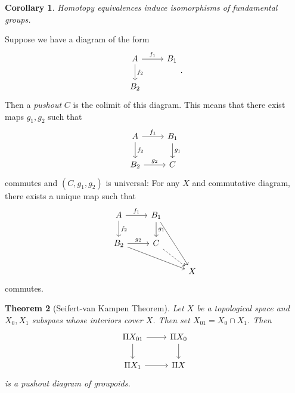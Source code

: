 \documentclass[leqno, openany]{memoir}
\newtheorem{thm}{Theorem}[section]
\newtheorem{cor}[thm]{Corollary}
\theoremstyle{definition}
\theoremstyle{remark}
\theoremstyle{plain}
\theoremstyle{definition}
\theoremstyle{remark}
\begin{document}
\begin{cor} Homotopy equivalences induce isomorphisms of fundamental groups.
\end{cor}

Suppose we have a diagram of the form \begin{equation} \begin{tikzcd} A
\arrow{r}{f_1} \arrow{d}{f_2} & B_1 \\ B_2 \end{tikzcd}.  \end{equation} Then a
\textit{pushout} $C$ is the colimit of this diagram. This means that there
exist maps $g_1, g_2$ such that \begin{equation} \begin{tikzcd} A
\arrow{r}{f_1} \arrow{d}{f_2} & B_1 \arrow{d}{g_1} \\ B_2 \arrow{r}{g_2} & C
\end{tikzcd} \end{equation} commutes and $(C, g_1, g_2)$ is universal: For any
$X$ and commutative diagram, there exists a unique map such that
\begin{equation} \begin{tikzcd} A \arrow{r}{f_1} \arrow{d}{f_2} & B_1
    \arrow{d}{g_1} \arrow{ddr} & \\ B_2 \arrow{r}{g_2} \arrow{drr} & C
    \arrow[dashrightarrow]{dr} &  \\ & & X \end{tikzcd} \end{equation}
    commutes.

\begin{thm}[Seifert-van Kampen Theorem] Let $X$ be a topological space and
    $X_0, X_1$ subspaes whose interiors cover $X$. Then set $X_{01} = X_0 \cap
    X_1$. Then \begin{equation} \begin{tikzcd} \Pi X_{01} \arrow{r} \arrow{d} &
        \Pi X_0 \arrow{d} \\ \Pi X_1 \arrow{r} & \Pi X \end{tikzcd}
    \end{equation} is a pushout diagram of groupoids.  \end{thm}
\end{document}
